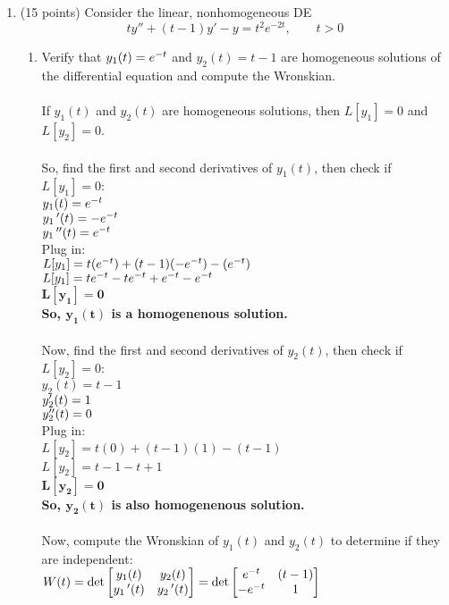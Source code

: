 \documentclass{article}
\begin{document}
\begin{enumerate}
\bigskip
\item (15 points) Consider the linear, nonhomogeneous DE
\[
ty'' + (t-1) y' - y = t^2 e^{-2t}, \qquad t>0
\]
\begin{enumerate}
\item Verify that $y_1(t) = e\sp{-t}$ and $y_2(t) = t-1$ are homogeneous solutions of the differential equation and compute the Wronskian.\\\\
If $y_1(t)$ and $y_2(t)$ are homogeneous solutions, then $L[y_1]=0$ and $L[y_2]=0$.\\\\
So, find the first and second derivatives of $y_1(t)$, then check if $L[y_1]=0$:\\
$y_1(t) = e\sp{-t}$\\
$y_1\,\sp{\prime}(t) = -e\sp{-t}$\\
$y_1\,\sp{\prime\prime}(t) = e\sp{-t}$\\
Plug in:\\
$L[y_1] = t(e\sp{-t}) + (t-1)(-e\sp{-t}) - (e\sp{-t})$\\
$L[y_1] = te\sp{-t} - te\sp{-t} + e\sp{-t} - e\sp{-t}$\\
$\bm{L[y_1] = 0}$\\
\textbf{So, $\bm{y_1(t)}$ is a homogenenous solution.}\\\\
Now, find the first and second derivatives of $y_2(t)$, then check if $L[y_2]=0$:\\
$y_2(t) = t-1$\\
$y_2\sp{\prime}(t) = 1$\\
$y_2\sp{\prime\prime}(t) = 0$\\
Plug in:\\
$L[y_2] = t(0) + (t-1)(1) - (t-1)$\\
$L[y_2] = t - 1 - t + 1$\\
$\bm{L[y_2] = 0}$\\
\textbf{So, $\bm{y_2(t)}$ is also homogenenous solution.}\\\\
Now, compute the Wronskian of $y_1(t)$ and $y_2(t)$ to determine if they are independent:\\
$W(t)=\det\begin{bmatrix}y_1(t) & y_2(t) \\ y_1\,\sp\prime(t) & y_2\,\sp\prime(t)\end{bmatrix} = \det\begin{bmatrix}e\sp{-t} & (t-1) \\ -e\sp{-t} & 1\end{bmatrix}$\\

\end{enumerate}
\end{enumerate}
\end{document}
